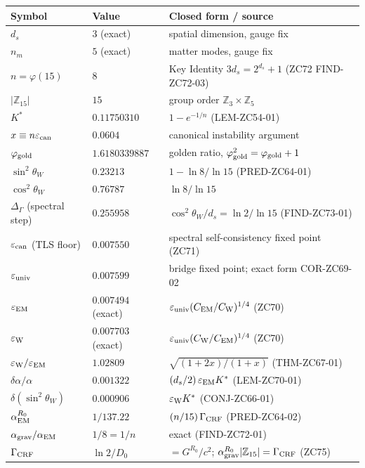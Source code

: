 \documentclass[11pt, a4paper]{article}
\newcommand{\swsq}{\sin^2\theta_W}
\newcommand{\cwsq}{\cos^2\theta_W}
\newcommand{\Ztf}{\mathbb{Z}_{15}}
\newcommand{\Zth}{\mathbb{Z}_3}
\newcommand{\Zfi}{\mathbb{Z}_5}
\newcommand{\epscan}{\varepsilon_{\rm can}}
\newcommand{\phig}{\varphi_{\rm gold}}
\newcommand{\Kstar}{K^*}
\begin{document}
\smallskip
{\small
\begin{longtable}{p{3.0cm} p{3.4cm} p{6.6cm}}
\toprule
Symbol & Value & Closed form / source \\
\midrule
\endhead
$d_s$ & $3$ (exact) & spatial dimension, gauge fix \\
$n_m$ & $5$ (exact) & matter modes, gauge fix \\
$n = \varphi(15)$ & $8$ & Key Identity $3d_s = 2^{d_s}+1$ (ZC72 FIND-ZC72-03) \\
$|\Ztf|$ & $15$ & group order $\Zth\times\Zfi$ \\
$\Kstar$ & $0.11750310$ & $1 - e^{-1/n}$ (LEM-ZC54-01) \\
$x \equiv n\epscan$ & $0.0604$ & canonical instability argument \\
$\phig$ & $1.6180339887$ & golden ratio, $\phig^2=\phig+1$ \\
$\swsq$ & $0.23213$ & $1 - \ln 8/\ln 15$ (PRED-ZC64-01) \\
$\cwsq$ & $0.76787$ & $\ln 8/\ln 15$ \\
$\Delta_\Gamma$ (spectral step) & $0.255958$ & $\cwsq/d_s = \ln 2/\ln 15$ (FIND-ZC73-01) \\
$\epscan$ (TLS floor) & $0.007550$ & spectral self-consistency fixed point (ZC71) \\
$\varepsilon_{\rm univ}$ & $0.007599$ & bridge fixed point; exact form COR-ZC69-02 \\
$\varepsilon_{\rm EM}$ & $0.007494$ (exact) & $\varepsilon_{\rm univ}(C_{\rm EM}/C_{\rm W})^{1/4}$ (ZC70) \\
$\varepsilon_{\rm W}$ & $0.007703$ (exact) & $\varepsilon_{\rm univ}(C_{\rm W}/C_{\rm EM})^{1/4}$ (ZC70) \\
$\varepsilon_{\rm W}/\varepsilon_{\rm EM}$ & $1.02809$ & $\sqrt{(1+2x)/(1+x)}$ (THM-ZC67-01) \\
$\delta\alpha/\alpha$ & $0.001322$ & $(d_s/2)\,\varepsilon_{\rm EM}\Kstar$ (LEM-ZC70-01) \\
$\delta(\swsq)$ & $0.000906$ & $\varepsilon_{\rm W}\Kstar$ (CONJ-ZC66-01) \\
$\alpha_{\rm EM}^{R_0}$ & $1/137.22$ & $(n/15)\,\Gamma_{\rm CRF}$ (PRED-ZC64-02) \\
$\alpha_{\rm grav}/\alpha_{\rm EM}$ & $1/8 = 1/n$ & exact (FIND-ZC72-01) \\
$\Gamma_{\rm CRF}$ & $\ln 2/D_0$ & $= G^{R_0}/c^2$; $\alpha_{\rm grav}^{R_0}|\Ztf|=\Gamma_{\rm CRF}$ (ZC75) \\
\bottomrule
\end{longtable}
}
\end{document}
